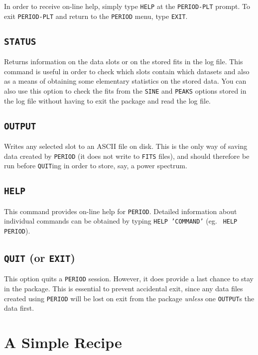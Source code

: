 In order
to receive on-line help, simply type {\tt HELP} at the {\tt PERIOD-PLT}
prompt. To exit {\tt PERIOD-PLT} and return to the {\tt PERIOD} menu,
type {\tt EXIT}.

\subsection*{\tt STATUS}

Returns information on the data slots or on the stored fits in the log file.
This command is useful in order to check which slots contain which datasets
and also as a means of obtaining some elementary statistics on the stored data.
You can also use this option to check the fits from the {\tt SINE} and
{\tt PEAKS} options stored in the log file without having to exit the package
and read the log file.

\subsection*{\tt OUTPUT}

Writes any selected slot to an ASCII file on disk. This is the only way of
saving data created by {\tt PERIOD} (it does not write to {\tt FITS} files),
and should therefore be run before {\tt QUIT}ing in order to store, say,
a power spectrum.

\subsection*{\tt HELP}

This command provides on-line help for {\tt PERIOD}. Detailed information about
individual commands can be obtained by typing {\tt HELP 'COMMAND'} (eg. {\tt
HELP PERIOD}).

\subsection*{{\tt QUIT} (or {\tt EXIT})}

This option quits a {\tt PERIOD} session. However, it does provide a last
chance to stay in the package. This is essential to prevent accidental exit,
since any data files created using {\tt PERIOD} will be lost on exit from the
package {\em unless} one {\tt OUTPUT}s the data first.

\section{A Simple Recipe}
\label{recipe}

